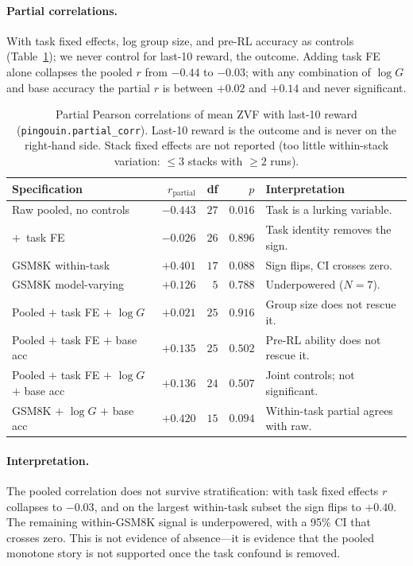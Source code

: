 \paragraph{Partial correlations.}
With task fixed effects, log group size, and pre-RL accuracy as controls
(Table~\ref{tab:zvf-partials}); we never control for last-10 reward, the
outcome. Adding task FE alone collapses the pooled $r$ from $-0.44$ to
$-0.03$; with any combination of $\log G$ and base accuracy the partial $r$
is between $+0.02$ and $+0.14$ and never significant.

\begin{table}[h]
\centering\small
\begin{tabular}{lrrrl}
\toprule
Specification & $r_{\text{partial}}$ & df & $p$ & Interpretation \\
\midrule
Raw pooled, no controls                          & $-0.443$ & $27$ & $0.016$ & Task is a lurking variable. \\
$+$~task FE                                      & $-0.026$ & $26$ & $0.896$ & Task identity removes the sign. \\
GSM8K within-task                                & $+0.401$ & $17$ & $0.088$ & Sign flips, CI crosses zero. \\
GSM8K model-varying                              & $+0.126$ & $5$  & $0.788$ & Underpowered ($N{=}7$). \\
Pooled $+$ task FE $+$ $\log G$                  & $+0.021$ & $25$ & $0.916$ & Group size does not rescue it. \\
Pooled $+$ task FE $+$ base acc                  & $+0.135$ & $25$ & $0.502$ & Pre-RL ability does not rescue it. \\
Pooled $+$ task FE $+$ $\log G$ $+$ base acc     & $+0.136$ & $24$ & $0.507$ & Joint controls; not significant. \\
GSM8K $+$ $\log G$ $+$ base acc                  & $+0.420$ & $15$ & $0.094$ & Within-task partial agrees with raw. \\
\bottomrule
\end{tabular}
\caption{Partial Pearson correlations of mean ZVF with last-10 reward
(\texttt{pingouin.partial\_corr}). Last-10 reward is the outcome and is never
on the right-hand side. Stack fixed effects are not reported (too little
within-stack variation: $\le 3$ stacks with $\ge 2$ runs).}
\label{tab:zvf-partials}
\end{table}

\paragraph{Interpretation.}
The pooled correlation does not survive stratification: with task fixed
effects $r$ collapses to $-0.03$, and on the largest within-task subset the
sign flips to $+0.40$. The remaining within-GSM8K signal is underpowered,
with a 95\% CI that crosses zero. This is not evidence of absence---it is
evidence that the pooled monotone story is not supported once the task
confound is removed.
